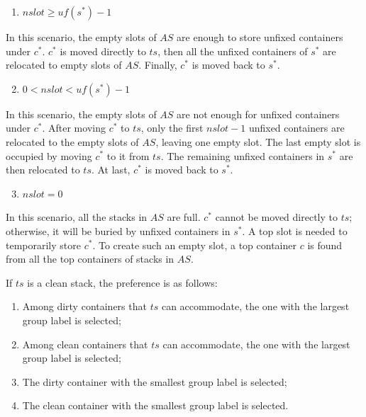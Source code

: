 \documentclass[review,3p,times,authoryear,12pt]{elsarticle}
\begin{document}
\begin{enumerate}
\setcounter{enumi}{0}
\item $\mathit{nslot}\ge \mathit{uf}(s^*)-1$
\end{enumerate}

In this scenario, the empty slots of $\mathit{AS}$ are enough to store unfixed containers under $c^*$. $c^*$ is moved directly to $\mathit{ts}$, then all the unfixed containers of $s^*$ are relocated to empty slots of $\mathit{AS}$. 
Finally, $c^*$ is moved back to $s^*$.

\begin{enumerate}
\setcounter{enumi}{1}
\item $0<\mathit{nslot}< \mathit{uf}(s^*)-1$
\end{enumerate}

In this scenario, the empty slots of $\mathit{AS}$ are not enough for unfixed containers under $c^*$. After moving $c^*$ to $\mathit{ts}$, only the first $\mathit{nslot}-1$ unfixed containers are relocated to the empty slots of $\mathit{AS}$, leaving one empty slot. 
The last empty slot is occupied by moving $c^*$ to it from $\mathit{ts}$. 
The remaining unfixed containers in $s^*$ are then relocated to $\mathit{ts}$. 
At last, $c^*$ is moved back to $s^*$.

\begin{enumerate}
\setcounter{enumi}{2}
\item $\mathit{nslot}=0$
\end{enumerate}

In this scenario, all the stacks in $\mathit{AS}$ are full. 
$c^*$ cannot be moved directly to $\mathit{ts}$; otherwise, it will be buried by unfixed containers in $s^*$. 
A top slot is needed to temporarily store $c^*$. 
To create such an empty slot, a top container $c$ is found from all the top containers of stacks in $\mathit{AS}$.

If $\mathit{ts}$ is a clean stack, the preference is as follows:
\begin{enumerate}[1.]
\item Among dirty containers that $\mathit{ts}$ can accommodate, the one with the largest group label is selected;
\item Among clean containers that $\mathit{ts}$ can accommodate, the one with the largest group label is selected;
\item The dirty container with the smallest group label is selected;
\item The clean container with the smallest group label is selected.
\end{enumerate}
\end{document}
